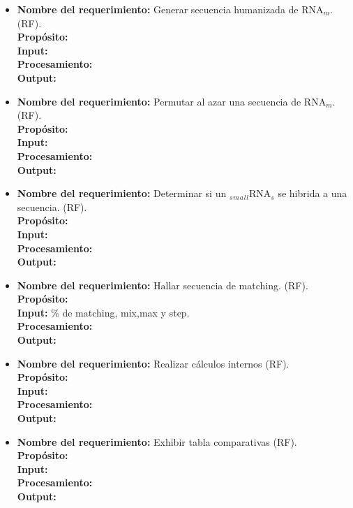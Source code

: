 \documentclass[12pt,a4paper,english,spanish]{article}
\begin{document}
\begin{itemize}
		\item \textbf{Nombre del requerimiento:} Generar secuencia humanizada de RNA$_m$. (RF).\\
  	    \textbf{Propósito:} \\
		\textbf{Input:} \\
		\textbf{Procesamiento:} \\
		\textbf{Output:} \\


		\item \textbf{Nombre del requerimiento:} Permutar al azar una secuencia de RNA$_m$. (RF).\\
  	    \textbf{Propósito:} \\
		\textbf{Input:} \\
		\textbf{Procesamiento:} \\
		\textbf{Output:} \\


		\item \textbf{Nombre del requerimiento:} Determinar si un $_s$$_m$$_a$$_l$$_l$RNA$_s$ se hibrida a una secuencia. (RF).\\
  	    \textbf{Propósito:} \\
		\textbf{Input:} \\
		\textbf{Procesamiento:} \\
		\textbf{Output:} \\
					
		\item \textbf{Nombre del requerimiento:} Hallar secuencia de matching. (RF).\\
  	    \textbf{Propósito:} \\
		\textbf{Input:} \% de matching, mix,max y step.\\
		\textbf{Procesamiento:} \\
		\textbf{Output:} \\

		\item \textbf{Nombre del requerimiento:} Realizar cálculos internos (RF).\\
  	    \textbf{Propósito:} \\
		\textbf{Input:} \\
		\textbf{Procesamiento:} \\
		\textbf{Output:} \\


		\item \textbf{Nombre del requerimiento:} Exhibir tabla comparativas (RF).\\
  	    \textbf{Propósito:} \\
		\textbf{Input:} \\
		\textbf{Procesamiento:} \\
		\textbf{Output:} \\


\end{itemize}
\end{document}
